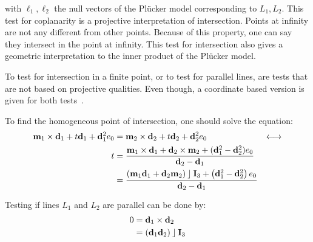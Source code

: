 with $\ell_1, \ell_2$ the null vectors of the Pl\"ucker model corresponding to $L_1, L_2$.  This test for coplanarity is a projective interpretation of intersection.  Points at infinity are not any different from other points.  Because of this property, one can say they intersect in the point at infinity.  This test for intersection also gives a geometric interpretation to the inner product of the Pl\"ucker model.

To test for intersection in a finite point, or to test for parallel lines, are tests that are not based on projective qualities.  Even though, a coordinate based version is given for both tests~\cite{Shoemake}.

To find the homogeneous point of intersection, one should solve the equation:
\begin{align*}
  \mathbf{m}_1 \times \mathbf{d}_1 + t \mathbf{d}_1 + \mathbf{d}_1^2 e_0 &= \mathbf{m}_2 \times \mathbf{d}_2 + t \mathbf{d}_2 + \mathbf{d}_2^2 e_0 &\longleftrightarrow \\
  t &= \frac{\mathbf{m}_1 \times \mathbf{d}_1 + \mathbf{d}_2 \times \mathbf{m}_2 + (\mathbf{d}_1^2 - \mathbf{d}_2^2) e_0}{\mathbf{d}_2 - \mathbf{d}_1} \\
  &= \frac{\left( \mathbf{m}_1 \mathbf{d}_1 + \mathbf{d}_2 \mathbf{m}_2 \right) \mathbin{\rfloor} \mathbf{I}_3 + \left( \mathbf{d}_1^2 - \mathbf{d}_2^2 \right) e_0} {\mathbf{d}_2 - \mathbf{d}_1}
\end{align*}

Testing if lines $L_1$ and $L_2$ are parallel can be done by: 
\begin{align*}
  0 &= \mathbf{d}_1 \times \mathbf{d}_2 \\
    &= \left( \mathbf{d}_1 \mathbf{d}_2 \right) \mathbin{\rfloor} \mathbf{I}_3
\end{align*}

